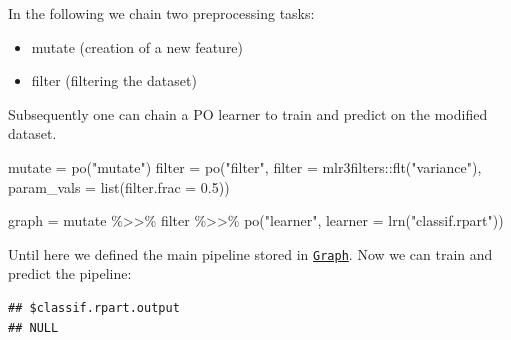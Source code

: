 \documentclass[
]{scrbook}
\newenvironment{Shaded}{\begin{snugshade}}{\end{snugshade}}
\newcommand{\AttributeTok}[1]{\textcolor[rgb]{0.77,0.63,0.00}{#1}}
\newcommand{\FloatTok}[1]{\textcolor[rgb]{0.00,0.00,0.81}{#1}}
\newcommand{\FunctionTok}[1]{\textcolor[rgb]{0.00,0.00,0.00}{#1}}
\newcommand{\NormalTok}[1]{#1}
\newcommand{\OtherTok}[1]{\textcolor[rgb]{0.56,0.35,0.01}{#1}}
\newcommand{\SpecialCharTok}[1]{\textcolor[rgb]{0.00,0.00,0.00}{#1}}
\newcommand{\StringTok}[1]{\textcolor[rgb]{0.31,0.60,0.02}{#1}}
\providecommand{\tightlist}{%
  \setlength{\itemsep}{0pt}\setlength{\parskip}{0pt}}
\renewenvironment{Shaded} {\begin{snugshade}\small} {\end{snugshade}}
\begin{document}
In the following we chain two preprocessing tasks:

\begin{itemize}
\tightlist
\item
  mutate (creation of a new feature)
\item
  filter (filtering the dataset)
\end{itemize}

Subsequently one can chain a PO learner to train and predict on the modified dataset.

\begin{Shaded}
\begin{Highlighting}[]
\NormalTok{mutate }\OtherTok{=} \FunctionTok{po}\NormalTok{(}\StringTok{"mutate"}\NormalTok{)}
\NormalTok{filter }\OtherTok{=} \FunctionTok{po}\NormalTok{(}\StringTok{"filter"}\NormalTok{,}
  \AttributeTok{filter =}\NormalTok{ mlr3filters}\SpecialCharTok{::}\FunctionTok{flt}\NormalTok{(}\StringTok{"variance"}\NormalTok{),}
  \AttributeTok{param\_vals =} \FunctionTok{list}\NormalTok{(}\AttributeTok{filter.frac =} \FloatTok{0.5}\NormalTok{))}

\NormalTok{graph }\OtherTok{=}\NormalTok{ mutate }\SpecialCharTok{\%\textgreater{}\textgreater{}\%}
\NormalTok{  filter }\SpecialCharTok{\%\textgreater{}\textgreater{}\%}
  \FunctionTok{po}\NormalTok{(}\StringTok{"learner"}\NormalTok{,}
    \AttributeTok{learner =} \FunctionTok{lrn}\NormalTok{(}\StringTok{"classif.rpart"}\NormalTok{))}
\end{Highlighting}
\end{Shaded}

Until here we defined the main pipeline stored in \href{https://mlr3pipelines.mlr-org.com/reference/Graph.html}{\texttt{Graph}}.
Now we can train and predict the pipeline:

\begin{Shaded}
\end{Shaded}

\begin{verbatim}
## $classif.rpart.output
## NULL
\end{verbatim}

\begin{Shaded}
\end{Shaded}
\end{document}
